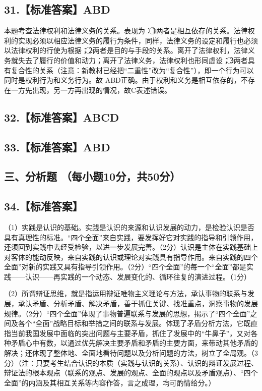 \documentclass[UTF8,11pt]{ctexart}
\begin{document}
\subsection*{31.【标准答案】ABD}

本题考查法律权利和法律义务的关系。表现为：\textcircled{1}两者是相互依存的关系。法律权利的实现必须以相应法律义务的履行为条件，同样，法律义务的设定和履行也必须以法律权利的行使为根据；\textcircled{2}两者是目的与手段的关系。离开了法律权利，法律义务就失去了履行的价值和动力；离开了法律义务，法律权利也形同虚设；\textcircled{3}两者具有复合性的关系（注意：新教材已经把“二重性”改为“复合性”），即一个行为可以同时是权利行为和义务行为。故 ABD正确。由于权利和义务是相互依存的，不存在一方先出现，另一方再出现的情况，故C表述错误。


\subsection*{32.【标准答案】ABCD}

\subsection*{33.【标准答案】ABD}

\subsection*{三、分析题 （每小题10分，共50分）}

\subsection*{34.【标准答案】}

（1）实践是认识的基础。实践是认识的来源和认识发展的动力，是检验认识是否具有真理性的标准。“四个全面”来自实践，要发挥好它对实践的指导和引领作用，还须回到实践中去经受检验，以进一步发展完善。（2分）认识是主体在实践基础上对客体的能动反映，来自实践的认识或理论对实践具有指导作用。来自实践的四个全面”对新的实践又具有指导引领作用。（2分）“四个全面”的每一个“全面”都是实践——认识——再实践的一个动态、发展变化的、循环往复的演进过程。（1分）


（2）所谓辩证思维，就是指运用辩证唯物主义理论与方法，承认事物的联系与发展，承认矛盾、分析矛盾、解决矛盾，善于抓住关键、找准重点，洞察事物的发展规律。（2分）“四个全面”体现了事物普遍联系与发展的思想，揭示了“四个全面”之间及各个“全面”战略目标和举措之间的联系与发展。体现了矛盾分析方法，它既直指当前我国发展中面临的突出问题与主要矛盾，抓住了发展中的“牛鼻子”，又对各种矛盾心中有数，以通过优先解决主要矛盾和矛盾的主要方面，来带动其他矛盾的解决；还体现了整体地、全面地看待问题以及分析问题的方法，树立了全局观。（3分）（注：只要考生结合认识的本质（实践与认识的关系）、认识的辩证发展过程、辩证法的根本观点（联系的观点、发展的观点、全面的观点以及矛盾观点）、“四个全面”的内涵及其相互关系等内容作答，言之成理，均可酌情给分。）
\end{document}
